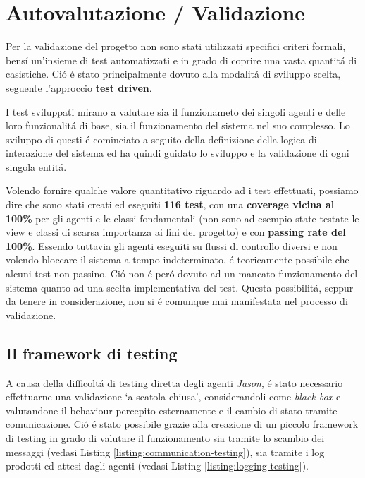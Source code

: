 \section{Autovalutazione / Validazione}



Per la validazione del progetto non sono stati utilizzati specifici criteri formali, bens\'i un’insieme di test automatizzati e in grado di coprire una vasta quantit\'a di casistiche. Ci\'o \'e stato principalmente dovuto alla modalit\'a di sviluppo scelta, seguente l'approccio \textbf{test driven}.

I test sviluppati mirano a valutare sia il funzionameto dei singoli agenti e delle loro funzionalit\'a di base, sia il funzionamento del sistema nel suo complesso. Lo sviluppo di questi \'e cominciato a seguito della definizione della logica di interazione del sistema ed ha quindi guidato lo sviluppo e la validazione di ogni singola entit\'a.

Volendo fornire qualche valore quantitativo riguardo ad i test effettuati, possiamo dire che sono stati creati ed eseguiti \textbf{116 test}, con una \textbf{coverage vicina al 100\%} per gli agenti e le classi fondamentali (non sono ad esempio state testate le view e classi di scarsa importanza ai fini del progetto) e con \textbf{passing rate del 100\%}. Essendo tuttavia gli agenti eseguiti su flussi di controllo diversi e non volendo bloccare il sistema a tempo indeterminato, \'e teoricamente possibile che alcuni test non passino. Ci\'o non \'e per\'o dovuto ad un mancato funzionamento del sistema quanto ad una scelta implementativa del test. Questa possibilit\'a, seppur da tenere in considerazione, non si \'e comunque mai manifestata nel processo di validazione.

\subsection{Il framework di testing}
A causa della difficolt\'a di testing diretta degli agenti \textit{Jason}, \'e stato necessario effettuarne una validazione `a scatola chiusa', considerandoli come \textit{black box} e valutandone il behaviour percepito esternamente e il cambio di stato tramite comunicazione. Ci\'o \'e stato possibile grazie alla creazione di un piccolo framework di testing in grado di valutare il funzionamento sia tramite lo scambio dei messaggi (vedasi Listing \ref{listing:communication-testing}), sia tramite i log prodotti ed attesi dagli agenti (vedasi Listing \ref{listing:logging-testing}).

